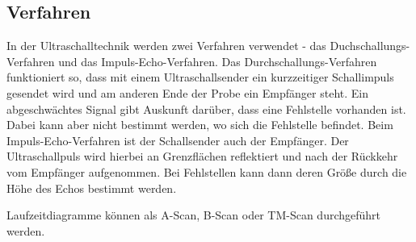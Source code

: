 \subsection{Verfahren}
In der Ultraschalltechnik werden zwei Verfahren verwendet - 
das Duchschallungs-Verfahren und das Impuls-Echo-Verfahren. 
\newline
Das Durchschallungs-Verfahren funktioniert so, dass mit einem 
Ultraschallsender ein kurzzeitiger Schallimpuls gesendet wird 
und am anderen Ende der Probe ein Empfänger steht. Ein 
abgeschwächtes Signal gibt Auskunft darüber, dass eine 
Fehlstelle vorhanden ist. Dabei kann aber nicht bestimmt 
werden, wo sich die Fehlstelle befindet.
\newline
Beim Impuls-Echo-Verfahren ist der Schallsender auch der 
Empfänger. Der Ultraschallpuls wird hierbei an Grenzflächen 
reflektiert und nach der Rückkehr vom Empfänger aufgenommen. 
Bei Fehlstellen kann dann deren Größe durch die Höhe des Echos
bestimmt werden. 

\noindent Laufzeitdiagramme können als A-Scan, B-Scan oder TM-Scan 
durchgeführt werden. %
